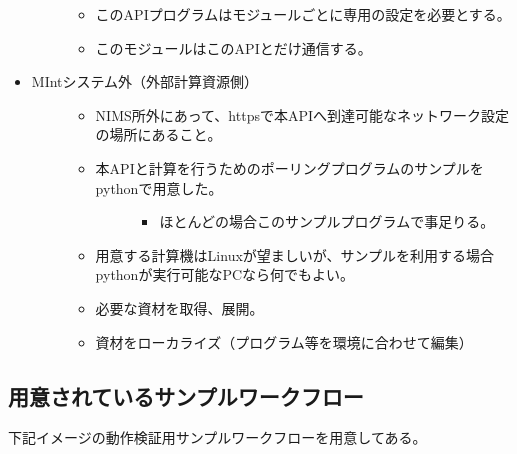 \documentclass[letterpaper,10pt,dvipdfmx,openany]{sphinxmanual}
\begin{document}
\begin{itemize}
\begin{description}
\begin{itemize}
\item {} 
このAPIプログラムはモジュールごとに専用の設定を必要とする。

\item {} 
このモジュールはこのAPIとだけ通信する。

\end{itemize}

\end{description}

\item {} \begin{description}
\item[{MIntシステム外（外部計算資源側）}] \leavevmode\begin{itemize}
\item {} 
NIMS所外にあって、httpsで本APIへ到達可能なネットワーク設定の場所にあること。

\item {} \begin{description}
\item[{本APIと計算を行うためのポーリングプログラムのサンプルをpythonで用意した。}] \leavevmode\begin{itemize}
\item {} 
ほとんどの場合このサンプルプログラムで事足りる。

\end{itemize}

\end{description}

\item {} 
用意する計算機はLinuxが望ましいが、サンプルを利用する場合pythonが実行可能なPCなら何でもよい。

\item {} 
必要な資材を取得、展開。

\item {} 
資材をローカライズ（プログラム等を環境に合わせて編集）

\end{itemize}

\end{description}

\end{itemize}


\subsection{用意されているサンプルワークフロー}
\label{\detokenize{using_distributed_properties:id19}}
下記イメージの動作検証用サンプルワークフローを用意してある。
\end{document}
